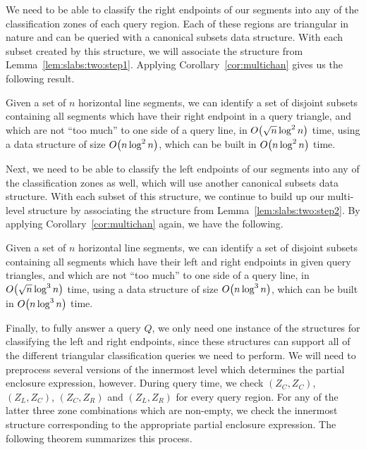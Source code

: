 We need to be able to classify the right endpoints of our segments into any of 
the classification zones of each query region.
Each of these regions are triangular in nature and can be queried with a 
canonical subsets data structure. 
With each subset created by this structure, we will associate the structure from 
Lemma~\ref{lem:slabs:two:step1}. 
Applying Corollary~\ref{cor:multichan} gives us the following result.

\begin{lemma}
\label{lem:slabs:two:step2}
Given a set of $n$ horizontal line segments, we can identify a set of disjoint 
subsets containing all segments which have their right endpoint in a query 
triangle, and which are not ``too much'' to one side of a query line, in 
$O\!\left(\sqrt{n}\log^2{n}\right)$ time, using a data structure of size 
$O\!\left(n\log^2{n}\right)$, which can be built in $O\!\left(n\log^2{n}\right)$ time.
\end{lemma}


Next, we need to be able to classify the left endpoints of our segments into any of 
the classification zones as well, which will use another canonical subsets data 
structure.
With each subset of this structure, we continue to build up our multi-level 
structure by associating the structure from Lemma~\ref{lem:slabs:two:step2}. 
By applying Corollary~\ref{cor:multichan} again, we have the following.

\begin{lemma}
\label{lem:slabs:two:step3}
Given a set of $n$ horizontal line segments, we can identify a set of disjoint 
subsets containing all segments which have their left and right endpoints in 
given query triangles, and which are not ``too much'' to one side of a query 
line, in $O\!\left(\sqrt{n}\log^3{n}\right)$ time, using a data structure of size 
$O\!\left(n\log^3{n}\right)$, which can be built in $O\!\left(n\log^3{n}\right)$ time.
\end{lemma}


Finally, 
to fully answer a query $Q$, we only need one instance of the structures for 
classifying the left and right endpoints, since these structures can support all 
of the different triangular classification queries we need to perform.
We will need to preprocess several versions of the innermost level which 
determines the partial enclosure expression, however.
During query time, we check $(Z_C, Z_C)$, $(Z_L, Z_C)$, $(Z_C, Z_R)$ and $(Z_L, 
Z_R)$ for every query region. 
For any of the latter three zone combinations which are non-empty, we check the 
innermost structure corresponding to the appropriate partial enclosure 
expression.
The following theorem summarizes this process.

